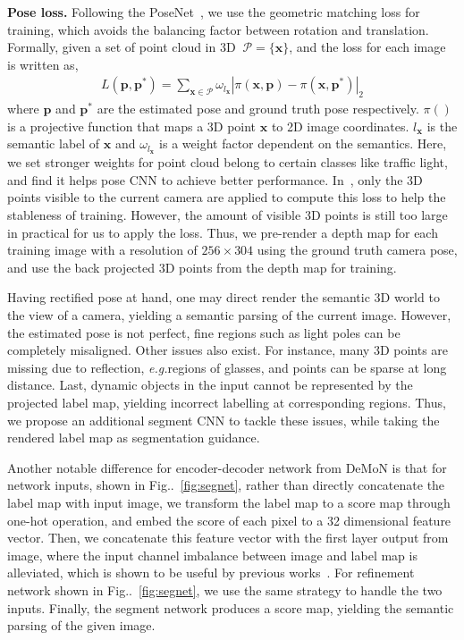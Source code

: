 \documentclass[10pt,twocolumn,letterpaper]{article}
\makeatletter
\newcommand{\figref}[1]{Fig\onedot~\ref{#1}}
\newcommand{\ve}[1]{{\mathbf #1}} %
\newcommand{\hua}[1]{{\mathcal #1}}
\DeclareRobustCommand\onedot{\futurelet\@let@token\@onedot}
\def\onedot{\ifx\@let@token.\else.\null\fi\xspace}
\def\eg{\emph{e.g.}}
\makeatother
\begin{document}
\textbf{Pose loss.}
Following the PoseNet~\cite{kendall2017geometric}, we use the geometric matching loss for training, which avoids the balancing factor between rotation and translation.
Formally, given a set of point cloud in 3D $~\hua{P}=\{\ve{x}\}$, and the loss for each image is written as,
{\vspace{-0.5\baselineskip}
\begin{align}
L(\ve{p}, \ve{p}^*) = \sum_{\ve{x} \in \hua{P}}\omega_{l_\ve{x}}|\pi(\ve{x}, \ve{p}) - \pi(\ve{x}, \ve{p}^*)|_2
\label{eq:proj_loss}
\end{align}
}
where $\ve{p}$ and $\ve{p}^*$ are the estimated pose and ground truth pose respectively. $\pi()$ is a projective function that maps a 3D point $\ve{x}$ to 2D image coordinates. $l_\ve{x}$ is the semantic label of $\ve{x}$ and $\omega_{l_\ve{x}}$ is a weight factor dependent on the semantics. Here, we set stronger weights for point cloud belong to certain classes like traffic light, and find it helps pose CNN to achieve better performance.
In~\cite{kendall2017geometric}, only the 3D points visible to the current camera are applied to compute this loss to help the stableness of training. However, the amount of visible 3D points is still too large in practical for us to apply the loss.
Thus, we pre-render a depth map for each training image with a resolution of $256 \times 304$ using the ground truth camera pose, and use the back projected 3D points from the depth map for training.

Having rectified pose at hand, one may direct render the semantic 3D world to the view of a camera, yielding a semantic parsing of the current image. However, the estimated pose is not perfect, fine regions such as light poles can be completely misaligned. Other issues also exist. For instance, many 3D points are missing due to reflection, \eg regions of glasses, and points can be sparse at long distance. Last, dynamic objects in the input cannot be represented by the projected label map, yielding incorrect labelling at corresponding regions. Thus, we propose an additional segment CNN to tackle these issues, while taking the rendered label map as segmentation guidance. 

Another notable difference for encoder-decoder network from DeMoN is that for network inputs, shown in \figref{fig:segnet}, rather than directly concatenate the label map with input image, we transform the label map to a score map through one-hot operation, and embed the score of each pixel to a 32 dimensional feature vector. 
Then, we concatenate this feature vector with the first layer output from image, where the input channel imbalance between image and label map is alleviated, which is shown to be useful by previous works~\cite{eigen2015predicting}.
 For refinement network shown in \figref{fig:segnet}, we use the same strategy to handle the two inputs. 
 Finally, the segment network produces a score map, yielding the semantic parsing of the given image.
\end{document}
